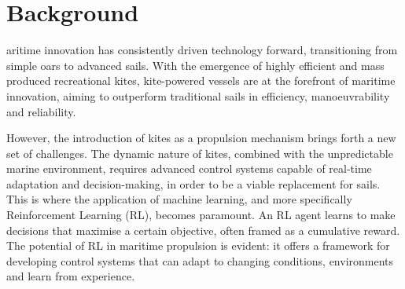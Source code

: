 %

%
\let\textcircled=\pgftextcircled\chapter{Background}\label{chap:background}






aritime innovation has consistently driven technology forward, transitioning from simple oars to advanced sails. With the emergence of highly efficient and mass produced recreational kites, kite-powered vessels are at the forefront of maritime innovation, aiming to outperform traditional sails in efficiency, manoeuvrability and reliability.

However, the introduction of kites as a propulsion mechanism brings forth a new set of challenges. The dynamic nature of kites, combined with the unpredictable marine environment, requires advanced control systems capable of real-time adaptation and decision-making, in order to be a viable replacement for sails. This is where the application of machine learning, and more specifically Reinforcement Learning (RL), becomes paramount. An RL agent learns to make decisions that maximise a certain objective, often framed as a cumulative reward. The potential of RL in maritime propulsion is evident: it offers a framework for developing control systems that can adapt to changing conditions, environments and learn from experience. 

